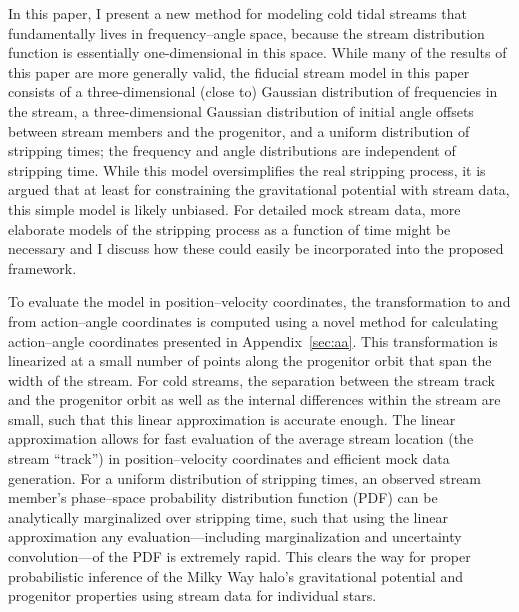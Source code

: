 \documentclass[12pt,preprint]{aastex}
\begin{document}
In this paper, I present a new method for modeling cold tidal streams
that fundamentally lives in frequency--angle space, because the stream
distribution function is essentially one-dimensional in this
space. While many of the results of this paper are more generally
valid, the fiducial stream model in this paper consists of a
three-dimensional (close to) Gaussian distribution of frequencies in
the stream, a three-dimensional Gaussian distribution of initial angle
offsets between stream members and the progenitor, and a uniform
distribution of stripping times; the frequency and angle distributions
are independent of stripping time. While this model oversimplifies the
real stripping process, it is argued that at least for constraining
the gravitational potential with stream data, this simple model is
likely unbiased. For detailed mock stream data, more elaborate models
of the stripping process as a function of time might be necessary and
I discuss how these could easily be incorporated into the proposed
framework.

To evaluate the model in position--velocity coordinates, the
transformation to and from action--angle coordinates is computed using
a novel method for calculating action--angle coordinates presented in
Appendix~\ref{sec:aa}. This transformation is linearized at a small
number of points along the progenitor orbit that span the width of the
stream. For cold streams, the separation between the stream track and
the progenitor orbit as well as the internal differences within the
stream are small, such that this linear approximation is accurate
enough. The linear approximation allows for fast evaluation of the
average stream location (the stream ``track'') in position--velocity
coordinates and efficient mock data generation. For a uniform
distribution of stripping times, an observed stream member's
phase--space probability distribution function (PDF) can be
analytically marginalized over stripping time, such that using the
linear approximation any evaluation---including marginalization and
uncertainty convolution---of the PDF is extremely rapid. This clears
the way for proper probabilistic inference of the Milky Way halo's
gravitational potential and progenitor properties using stream data
for individual stars.
\end{document}
